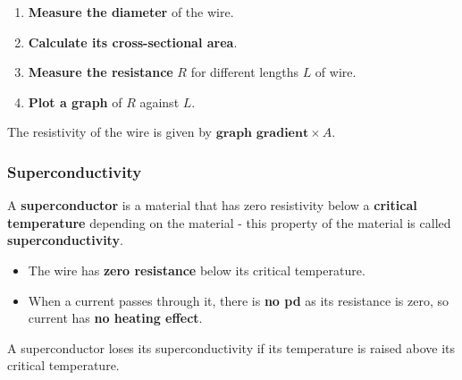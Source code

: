 \begin{enumerate}
    \item \textbf{Measure the diameter} of the wire.
    \item \textbf{Calculate its cross-sectional area}.
    \item \textbf{Measure the resistance} $R$ for different lengths $L$ of wire.
    \item \textbf{Plot a graph} of $R$ against $L$.
\end{enumerate}

The resistivity of the wire is given by $\textbf{graph gradient}\times A$.

\subsubsection*{Superconductivity}

A \textbf{superconductor} is a material that has zero resistivity below a \textbf{critical temperature} depending on the material - this property of the material is called \textbf{superconductivity}.
\begin{itemize}
    \item The wire has \textbf{zero resistance} below its critical temperature.
    \item When a current passes through it, there is \textbf{no pd} as its resistance is zero, so current has \textbf{no heating effect}.
\end{itemize}

A superconductor loses its superconductivity if its temperature is raised above its critical temperature.
